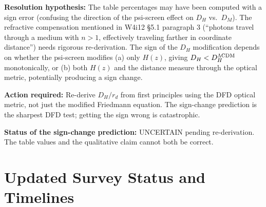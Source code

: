\documentclass[11pt,a4paper]{article}
\begin{document}
\begin{tensionbox}
\textbf{Resolution hypothesis:} The table percentages may have been
computed with a sign error (confusing the direction of the psi-screen
effect on $D_H$ vs.\ $D_M$). The refractive compensation mentioned in
W4i12 \S5.1 paragraph 3 (``photons travel through a medium with $n > 1$,
effectively traveling farther in coordinate distance'') needs rigorous
re-derivation. The sign of the $D_H$ modification depends on whether
the psi-screen modifies (a) only $H(z)$, giving $D_H < D_H^{\Lambda\rm CDM}$
monotonically, or (b) both $H(z)$ and the distance measure through the
optical metric, potentially producing a sign change.

\textbf{Action required:} Re-derive $D_H/r_d$ from first principles
using the DFD optical metric, not just the modified Friedmann equation.
The sign-change prediction is the sharpest DFD test; getting the sign
wrong is catastrophic.

\textbf{Status of the sign-change prediction:} UNCERTAIN pending
re-derivation. The table values and the qualitative claim cannot both be
correct.
\end{tensionbox}

\section{Updated Survey Status and Timelines}
\label{sec:timelines}
\end{document}
